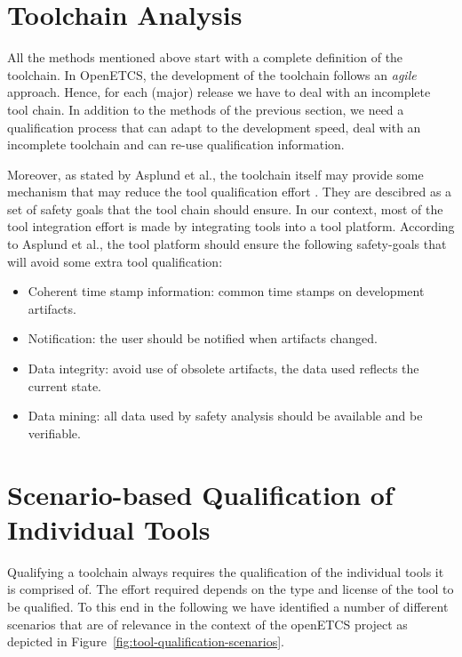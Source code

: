 \section{Toolchain Analysis}
\label{sec:toolchain-analysis}

All the methods mentioned above start with a complete definition of the toolchain. In OpenETCS, the development of the toolchain follows an \emph{agile} approach.
Hence, for each (major) release we have to deal with an incomplete tool
chain. In addition to the methods of the previous section,  we need a qualification
process that can adapt to the development speed, deal with an incomplete toolchain
and can re-use qualification information.

Moreover, as stated by Asplund et al., the toolchain itself may
provide some mechanism that may reduce the tool qualification effort
\cite{asplund_towards_2012,asplund_qualifying_2012}. They are
descibred as a set of safety goals that the tool chain should ensure.
 In our context, most of the
tool integration effort is made by integrating tools into a tool
platform.  According to Asplund et al., the tool platform should
ensure the following safety-goals that will avoid some extra tool qualification:
\begin{itemize}
\item Coherent time stamp information: common time stamps on development artifacts.
\item Notification: the user should be notified when artifacts changed.
\item Data integrity:  avoid use of obsolete artifacts, the data used reflects the
  current state.
\item Data mining: all data used by safety analysis should be available and be
  verifiable.
\end{itemize}

\section{Scenario-based Qualification of Individual Tools}
\label{sec:scenario-based-tool-quali}

Qualifying a toolchain always requires the qualification of the individual tools it is comprised of. The effort required depends on the type and license of the tool to be qualified. To this end in the following we have identified a number of different scenarios that are of relevance in the context of the openETCS project as depicted in Figure~\ref{fig:tool-qualification-scenarios}.

